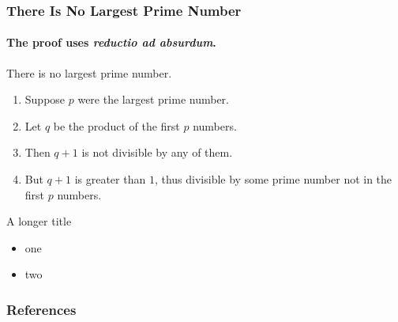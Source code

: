 \documentclass[
  xcolor={svgnames},
  hyperref={colorlinks,citecolor=DeepPink4,linkcolor=DarkRed,urlcolor=DarkBlue}
  ]{beamer}
\begin{document}
\begin{frame}
\frametitle{There Is No Largest Prime Number}
\framesubtitle{The proof uses \textit{reductio ad absurdum}.}
\begin{theorem}
There is no largest prime number. \end{theorem}
\begin{enumerate}
\item<1-| alert@1> Suppose $p$ were the largest prime number.
\item<2-> Let $q$ be the product of the first $p$ numbers.
\item<3-> Then $q+1$ is not divisible by any of them.
\item<1-> But $q + 1$ is greater than $1$, thus divisible by some prime
number not in the first $p$ numbers.
\end{enumerate}
\end{frame}

\begin{frame}{A longer title}
\begin{itemize}
\item one
\item two
\end{itemize}
\end{frame}


\begin{frame}[allowframebreaks]
   \frametitle{References}
   
   
\end{frame}
\end{document}
